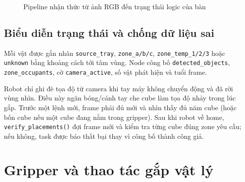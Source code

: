 \documentclass[a4paper,12pt]{article}
\newcommand{\code}[1]{\texttt{#1}}
\begin{document}
\begin{figure}[H]
\centering
{}
\caption{Pipeline nhận thức từ ảnh RGB đến trạng thái logic của bàn}
\label{fig:camera-pipeline}
\end{figure}

\subsection{Biểu diễn trạng thái và chống dữ liệu sai}
Mỗi vật được gắn nhãn \code{source\_tray}, \code{zone\_a/b/c},
\code{zone\_temp\_1/2/3} hoặc \code{unknown} bằng khoảng cách tới tâm vùng.
Node công bố \code{detected\_objects}, \code{zone\_occupants}, cờ
\code{camera\_active}, số vật phát hiện và tuổi frame.

Robot chỉ ghi đè tọa độ từ camera khi tay máy không chuyển động và đã rời vùng
nhìn. Điều này ngăn bóng/cánh tay che cube làm tọa độ nhảy trong lúc gắp. Trước
một lệnh mới, frame phải đủ mới và nhìn thấy đủ năm cube (hoặc bốn cube nếu một
cube đang nằm trong gripper). Sau khi robot về home, \code{verify\_placements()}
đợi frame mới và kiểm tra từng cube đúng zone yêu cầu; nếu không, task được báo
thất bại thay vì công bố thành công giả.

\section{Gripper và thao tác gắp vật lý}
\end{document}
